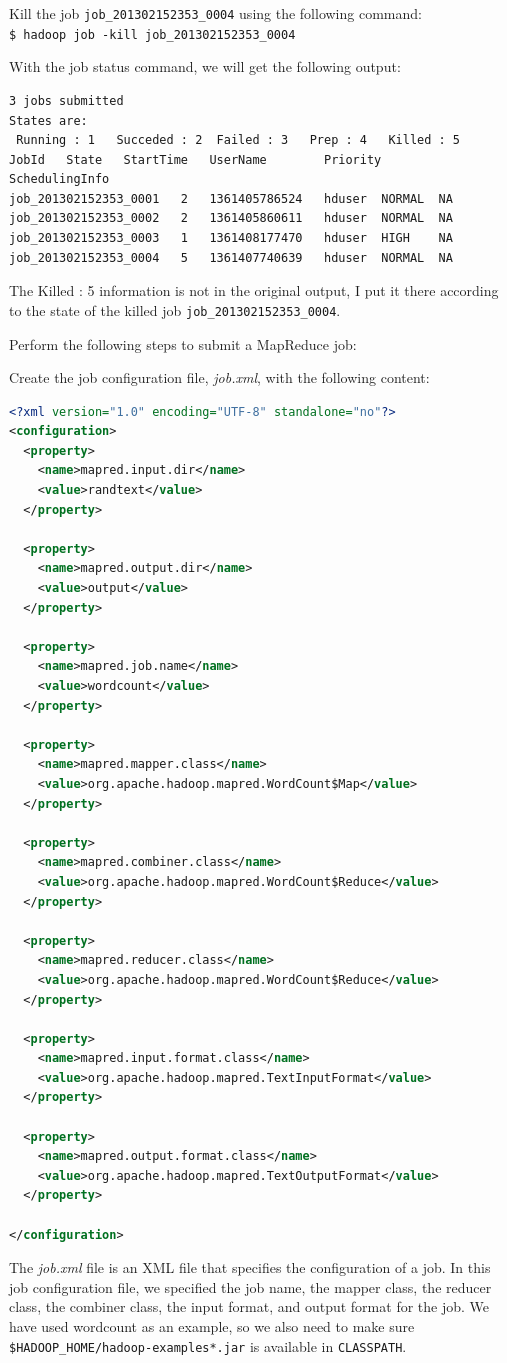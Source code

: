 Kill the job \verb|job_201302152353_0004| using the following command: \\
\verb|$ hadoop job -kill job_201302152353_0004|

With the job status command, we will get the following output:
\lstset{style=bashstyle}
\begin{lstlisting}
3 jobs submitted
States are:
 Running : 1   Succeded : 2  Failed : 3   Prep : 4   Killed : 5
JobId   State   StartTime   UserName        Priority        SchedulingInfo
job_201302152353_0001   2   1361405786524   hduser  NORMAL  NA
job_201302152353_0002   2   1361405860611   hduser  NORMAL  NA
job_201302152353_0003   1   1361408177470   hduser  HIGH    NA
job_201302152353_0004   5   1361407740639   hduser  NORMAL  NA
\end{lstlisting}

\begin{info}
The Killed : 5 information is not in the original output, I put it there according to the state of the killed job \verb|job_201302152353_0004|.
\end{info}

Perform the following steps to submit a MapReduce job:

Create the job configuration file, \emph{job.xml}, with the following content:
\lstset{style=bashstyle}
\begin{lstlisting}[language=XML]
<?xml version="1.0" encoding="UTF-8" standalone="no"?>
<configuration>
  <property>
    <name>mapred.input.dir</name>
    <value>randtext</value>
  </property>

  <property>
    <name>mapred.output.dir</name>
    <value>output</value>
  </property>

  <property>
    <name>mapred.job.name</name>
    <value>wordcount</value>
  </property>

  <property>
    <name>mapred.mapper.class</name>
    <value>org.apache.hadoop.mapred.WordCount$Map</value>
  </property>

  <property>
    <name>mapred.combiner.class</name>
    <value>org.apache.hadoop.mapred.WordCount$Reduce</value>
  </property>

  <property>
    <name>mapred.reducer.class</name>
    <value>org.apache.hadoop.mapred.WordCount$Reduce</value>
  </property>

  <property>
    <name>mapred.input.format.class</name>
    <value>org.apache.hadoop.mapred.TextInputFormat</value>
  </property>

  <property>
    <name>mapred.output.format.class</name>
    <value>org.apache.hadoop.mapred.TextOutputFormat</value>
  </property>

</configuration>
\end{lstlisting}
The \emph{job.xml} file is an XML file that specifies the configuration of a job. In this job configuration file, we specified the job name, the mapper class, the reducer class, the combiner class, the input format, and output format for the job. We have used wordcount as an example, so we also need to make sure \verb|$HADOOP_HOME/hadoop-examples*.jar| is available in \verb|CLASSPATH|.

